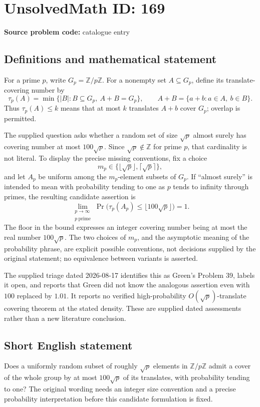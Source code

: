 \documentclass[11pt]{article}
\newcommand{\Z}{\mathbb{Z}}
\begin{document}
\section*{UnsolvedMath ID: 169}
\textbf{Source problem code:} catalogue entry
\subsection{Definitions and mathematical statement}
For a prime \(p\), write \(G_p=\Z/p\Z\). For a nonempty set \(A\subseteq G_p\), define its translate-covering number by
\[
\tau_p(A)=\min\bigl\{|B|:B\subseteq G_p,\ A+B=G_p\bigr\},
\qquad A+B=\{a+b:a\in A,\ b\in B\}.
\]
Thus \(\tau_p(A)\leq k\) means that at most \(k\) translates \(A+b\) cover \(G_p\); overlap is permitted.

The supplied question asks whether a random set of size \(\sqrt p\) almost surely has covering number at most \(100\sqrt p\). Since \(\sqrt p\notin\Z\) for prime \(p\), that cardinality is not literal. To display the precise missing conventions, fix a choice
\[
m_p\in\{\lfloor\sqrt p\rfloor,\lceil\sqrt p\rceil\},
\]
and let \(A_p\) be uniform among the \(m_p\)-element subsets of \(G_p\). If ``almost surely'' is intended to mean with probability tending to one as \(p\) tends to infinity through primes, the resulting candidate assertion is
\[
\lim_{\substack{p\to\infty\\p\ \mathrm{prime}}}
\Pr\bigl(\tau_p(A_p)\leq\lfloor100\sqrt p\rfloor\bigr)=1.
\]
The floor in the bound expresses an integer covering number being at most the real number \(100\sqrt p\). The two choices of \(m_p\), and the asymptotic meaning of the probability phrase, are explicit possible conventions, not decisions supplied by the original statement; no equivalence between variants is asserted.

The supplied triage dated 2026-08-17 identifies this as Green's Problem 39, labels it open, and reports that Green did not know the analogous assertion even with \(100\) replaced by \(1.01\). It reports no verified high-probability \(O(\sqrt p)\)-translate covering theorem at the stated density. These are supplied dated assessments rather than a new literature conclusion.
\subsection{Short English statement}
Does a uniformly random subset of roughly \(\sqrt p\) elements in \(\Z/p\Z\) admit a cover of the whole group by at most \(100\sqrt p\) of its translates, with probability tending to one? The original wording needs an integer size convention and a precise probability interpretation before this candidate formulation is fixed.
\end{document}
